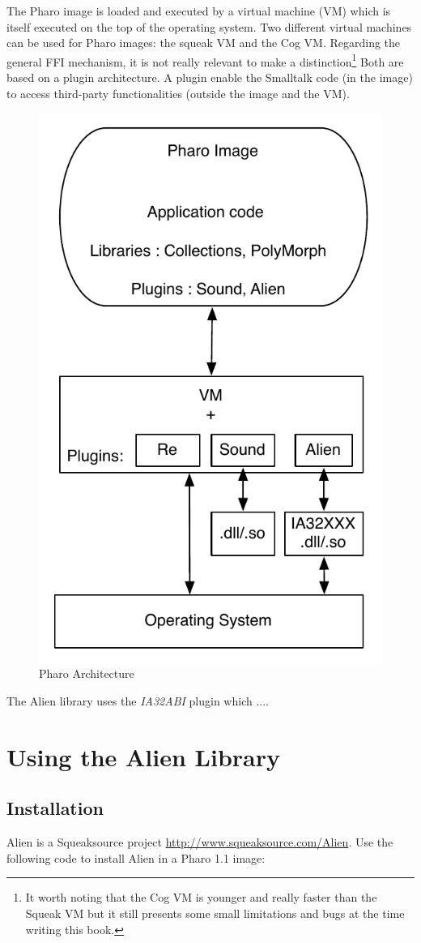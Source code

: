 \documentclass[a4paper,10pt,twoside]{book}
\begin{document}
The Pharo image is loaded and executed by a virtual machine (VM) which is itself executed on the top of the operating system. 
Two different virtual machines can be used for Pharo images: the squeak VM and the Cog VM.
Regarding the general FFI mechanism, it is not really relevant to make a distinction\footnote{It worth noting that the Cog VM is younger and really faster than the Squeak VM but it still presents some small limitations and bugs at the time writing this book.} 
Both are based on a plugin architecture.
A plugin enable the Smalltalk code (in the image) to access third-party functionalities (outside the image and the VM).

\begin{figure}[htbp]
	\centering
		\includegraphics[width=0.4\linewidth]{figs/plugins.pdf}
	\caption{Pharo Architecture}
	\label{fig:plugins}
\end{figure}

The Alien library uses the \emph{IA32ABI} plugin which ....



\section{Using the Alien Library} \label{sec:the_alien_library} %

\subsection{Installation} \label{sec:installation} %

Alien is a Squeaksource project \url{http://www.squeaksource.com/Alien}. 
Use the following code to install Alien in a Pharo 1.1 image:
\end{document}
